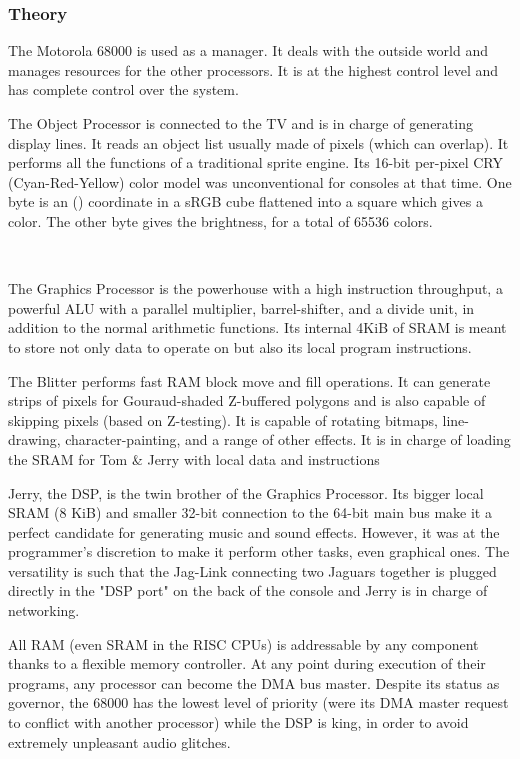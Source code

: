 \subsubsection{Theory}
\par
The Motorola 68000 is used as a manager. It deals with the outside world and manages resources for the other processors. It is at the highest control level and has complete control over the system.\\
\par
The Object Processor is connected to the TV and is in charge of generating display lines. It reads an object list usually made of pixels (which can overlap). It performs all the functions of a traditional sprite engine. Its 16-bit per-pixel CRY (Cyan-Red-Yellow) color model was unconventional for consoles at that time. One byte is an () coordinate in a sRGB cube flattened into a square which gives a color. The other byte gives the brightness, for a total of 65536 colors.\\
\par
{}\\
\par

\par
The Graphics Processor is the powerhouse with a high instruction throughput, a powerful ALU with a parallel multiplier, barrel-shifter, and a divide unit, in addition to the normal arithmetic functions. Its internal 4KiB of SRAM is meant to store not only data to operate on but also its local program instructions.\\
\par
The Blitter performs fast RAM block move and fill operations. It can generate strips of pixels for Gouraud-shaded Z-buffered polygons and is also capable of skipping pixels (based on Z-testing). It is capable of rotating bitmaps, line-drawing, character-painting, and a range of other effects. It is in charge of loading the SRAM for Tom \& Jerry with local data and instructions\\
\par
Jerry, the DSP, is the twin brother of the Graphics Processor. Its bigger local SRAM (8 KiB) and smaller 32-bit connection to the 64-bit main bus make it a perfect candidate for generating music and sound effects. However, it was at the programmer's discretion to make it perform other tasks, even graphical ones. The versatility is such that the Jag-Link connecting two Jaguars together is plugged directly in the "DSP port" on the back of the console and Jerry is in charge of networking.\\
\par
All RAM (even SRAM in the RISC CPUs) is addressable by any component thanks to a flexible memory controller. At any point during execution of their programs, any processor can become the DMA bus master. Despite its status as governor, the 68000 has the lowest level of priority (were its DMA master request to conflict with another processor) while the DSP is king, in order to avoid extremely unpleasant audio glitches.
\par




